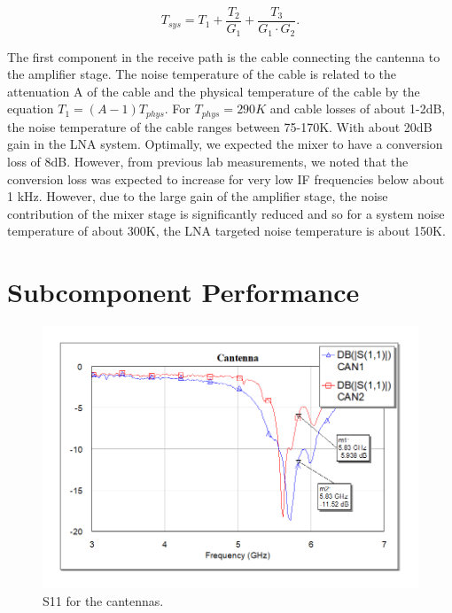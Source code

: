 \documentclass[reprint, aps, prl]{revtex4-1}
\begin{document}
\begin{equation}
T_{sys} = T_1 + \frac{T_2}{G_1} + \frac{T_3}{G_1 \cdot G_2}.
\end{equation}

The first component in the receive path is the cable connecting the cantenna to the amplifier stage. The noise temperature of the cable is related to the attenuation A of the cable and the physical temperature of the cable by the equation $T_1 = (A - 1) T_{phys}$. For $T_{phys} = 290 K$ and cable losses of about 1-2dB, the noise temperature of the cable ranges between 75-170K. With about 20dB gain in the LNA system. Optimally, we expected the mixer to have a conversion loss of 8dB. However, from previous lab measurements, we noted that the conversion loss was expected to increase for very low IF frequencies below about 1 kHz. However, due to the large gain of the amplifier stage, the noise contribution of the mixer stage is significantly reduced and so for a system noise temperature of about 300K, the LNA targeted noise temperature is about 150K. 


\section*{Subcomponent Performance}
\begin{figure}[!htbp]
    \centering
    \includegraphics[scale=0.35]{Cantenna_S11}
    \caption{S11 for the cantennas.}
    \label{fig:cantennaS11}
\end{figure}
\end{document}
